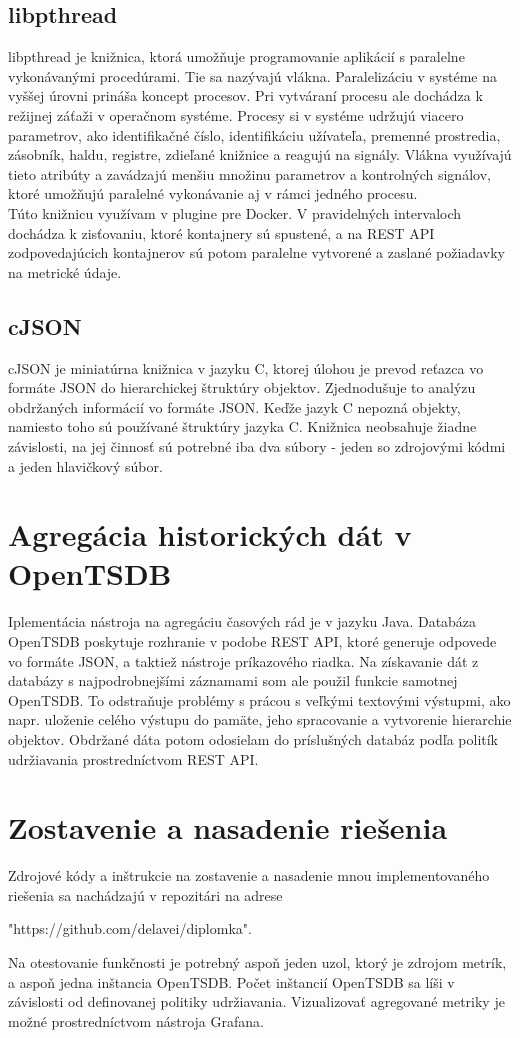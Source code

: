 \documentclass[printed,11pt,twoside,color,cover,table]{fithesis3}
\begin{document}
\subsection{libpthread}
libpthread je knižnica, ktorá umožňuje programovanie aplikácií s paralelne vykonávanými procedúrami. Tie sa nazývajú vlákna. Paralelizáciu
v systéme na vyššej úrovni prináša koncept procesov. Pri
vytváraní procesu ale dochádza k režijnej záťaži v operačnom systéme. Procesy si v systéme udržujú viacero parametrov, ako identifikačné
číslo, identifikáciu užívateľa, premenné prostredia, zásobník, haldu, registre, zdieľané knižnice a reagujú na signály. Vlákna využívajú
tieto atribúty a zavádzajú menšiu množinu parametrov a kontrolných signálov, ktoré umožňujú paralelné vykonávanie aj v rámci jedného procesu.
\\Túto knižnicu využívam v plugine pre Docker. V pravidelných intervaloch dochádza k zisťovaniu, ktoré kontajnery sú spustené, a na REST API
zodpovedajúcich kontajnerov sú potom paralelne vytvorené a zaslané požiadavky na metrické údaje.

\subsection{cJSON}
cJSON je miniatúrna knižnica v jazyku C, ktorej úlohou je prevod reťazca vo formáte JSON do hierarchickej štruktúry objektov. Zjednodušuje
to analýzu obdržaných informácií vo formáte JSON. Keďže jazyk C nepozná objekty, namiesto toho sú používané štruktúry jazyka C. 
Knižnica neobsahuje žiadne závislosti, na jej činnosť sú potrebné iba dva súbory - jeden so zdrojovými kódmi a jeden hlavičkový súbor.

\section{Agregácia historických dát v OpenTSDB}
Iplementácia nástroja na agregáciu časových rád je v jazyku Java. Databáza OpenTSDB poskytuje rozhranie v podobe REST API, ktoré
generuje odpovede vo formáte JSON, a taktiež
nástroje príkazového riadka. Na získavanie dát z databázy s najpodrobnejšími záznamami som ale použil
funkcie samotnej OpenTSDB. To odstraňuje problémy s prácou s veľkými textovými výstupmi, ako napr. uloženie celého výstupu do pamäte,
jeho spracovanie a vytvorenie hierarchie objektov. Obdržané dáta potom odosielam do príslušných databáz podľa politík udržiavania
prostredníctvom REST API.

\section{Zostavenie a nasadenie riešenia}
Zdrojové kódy a inštrukcie na zostavenie a nasadenie mnou implementovaného riešenia sa nachádzajú v repozitári na adrese \begin{sloppypar}"https://github.com/delavei/diplomka".\end{sloppypar}
Na otestovanie funkčnosti je potrebný aspoň jeden uzol, ktorý je zdrojom metrík, a aspoň jedna inštancia OpenTSDB. Počet inštancií OpenTSDB sa líši v závislosti od definovanej politiky 
udržiavania. Vizualizovať agregované metriky je možné prostredníctvom nástroja Grafana.
\end{document}
